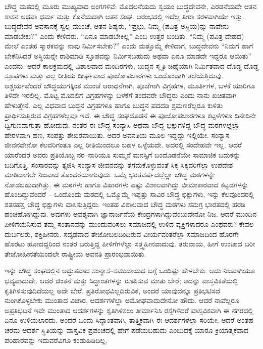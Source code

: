 ಬೌದ್ಧ ಮತದಲ್ಲಿ ಮೂರು ಮುಖ್ಯವಾದ ಅಂಗಗಳಿವೆ: ಮೊದಲನೆಯದು ಸ್ವಯಂ ಬುದ್ಧದೇವನೇ, ಎರಡನೆಯದೇ ಆತನ ಶಾಸನ ಅಥವಾ ಧರ್ಮ ಮತ್ತು ಕೊನೆಯದಾಗಿ ಆತನ ಸಂಘ. ಆರಂಭದಲ್ಲಿ ಇದೆಲ್ಲ ತೀರಾ ಸರಳವಾಗಿಯೇ ಇತ್ತು. ಬುದ್ಧದೇವನ ಅವಸಾನಕ್ಕೆ ಸ್ವಲ್ಪ ಮುಂಚೆ, ಆತನ ಶಿಷ್ಯರು, “ಪ್ರಭು, ನಿಮ್ಮ (ಪವಿತ್ರ ಅಸ್ಥಿಯ)ನ್ನು ನಾವೇನು ಮಾಡಬೇಕು?” ಎಂದು ಕೇಳಿದರು. “ಏನೂ ಮಾಡಬೇಕಿಲ್ಲ” ಎಂಬ ಉತ್ತರ ಬಂದಿತು. “ನಿಮ್ಮ (ಪವಿತ್ರ ದೇಹದ) ಮೇಲೆ ಎಂತಹ ಸ್ಮಾರಕವನ್ನು ನಾವು ನಿರ್ಮಿಸಬೇಕು?” ಎಂದು ಮತ್ತೊಮ್ಮೆ ಕೇಳಿದಾಗ, ಬುದ್ಧದೇವನು “ನಿಮಗೆ ಹಾಗೆ ಬೇಕೆನಿಸಿದರೆ ಅಸ್ಥಿಯನ್ನೇ ರಾಶಿಮಾಡಿ ಸ್ತೂಪವನ್ನು ನಿರ್ಮಿಸಬಹುದು ಅಥವಾ ಏನೂ ಮಾಡದೇ ಇದ್ದರೂ ಆಯಿತು” ಎಂದನು. ಆದರೆ ಕಾಲಕ್ರಮದಲ್ಲಿ ವಿಶಾಲವಾದ ಮಂದಿರಗಳು, ಬುದ್ಧನ ಸ್ಮೃತಿ ಚಿಹ್ನೆಯಾಗಿ ನಿರ್ಮಿತವಾದ ದೊಡ್ಡ ದೊಡ್ಡ ಸ್ತೂಪಗಳು ಮತ್ತು ಎಲ್ಲ ರೀತಿಯ ದೀರ್ಘವಾದ ಪೂಜೋಪಚಾರಗಳು ಒಂದೊಂದಾಗಿ ತಲೆಯೆತ್ತಿದುವು. ಆಶ್ಚರ್ಯವೆಂದರೆ ಬೌದ್ಧಯುಗಕ್ಕಿಂತ ಮುಂಚೆ ಆರಾಧನೆಗಾಗಿ, ಪೂಜೆಗಾಗಿ ವಿಗ್ರಹಗಳ, ಮೂರ್ತಿಗಳ, ಬಳಕೆ ಯಾರಿಗೂ ತಿಳಿದೇ ಇರಲಿಲ್ಲ. ಮೊಟ್ಟ ಮೊದಲಿಗೆ ವಿಗ್ರಹಗಳನ್ನು ಬಳಕೆಗೆ ತಂದವರೇ ಬೌದ್ಧರು ಎಂದು ನಾನು ಖಚಿತವಾಗಿ ಹೇಳುತ್ತೇನೆ. ಎಲ್ಲ ವಿಧವಾದ ಬುದ್ಧನ ವಿಗ್ರಹಗಳೂ ಹಾಗೂ ಬುದ್ಧನ ಪದದಡಿ ಶ್ರಮಣರೆಲ್ಲರೂ ಕುಳಿತು ಪ್ರಾರ್ಥಿಸುತ್ತಿರುವ ವಿಗ್ರಹಗಳೆಲ್ಲವೂ ಇವೆ. ಈ ಬೌದ್ಧ ಸಂಘದೊಡನೆ ಈ ಪೂಜೋಪಚಾರಗಳೂ ಕಟ್ಟಳೆಗಳೂ ದಿನೇದಿನೇ ದ್ವಿಗುಣವಾಗುತ್ತಾ ಹೋದುವು. ನಂತರ ಈ ಬೌದ್ಧ ಸಂನ್ಯಾಸಿ ಅಥವಾ ಬೌದ್ಧ ಭಿಕ್ಷುಗಳಿದ್ದ ಬೌದ್ಧ ಮಠಗಳಲ್ಲೆಲ್ಲಾ ಹೇರಳವಾಗಿ ಹಣ, ಸಂಪತ್ತು ಶೇಖರವಾಯಿತು. ಅದರ ಅವನತಿಯ ಮೂಲ ಇದ್ದದ್ದು ಇಲ್ಲಿಯೇ. ಸಂನ್ಯಾಸ ಜೀವನವೇನೋ ಕೆಲವರಿಗಂತೂ ಎಲ್ಲ ರೀತಿಯಿಂದಲೂ ಬಹಳ ಒಳ್ಳೆಯದೇ. ಅದರಲ್ಲಿ ಸಂದೇಹವೇ ಇಲ್ಲ. ಆದರೆ ಯಾರೆಂದರೆ ಅವರು ಪ್ರತಿಯೊಬ್ಬ ನರ–ನಾರಿಯೂ ಸುಮ್ಮನೆ ಮನಸ್ಸಿಗೆ ಬಂದೊಡನೆಯೇ ಸಾಮಾಜಿಕ ಬದುಕನ್ನು ಬದಿಗೊತ್ತಿ, ಸಂಸಾರವನ್ನು ತ್ಯಜಿಸಿ ಸಂನ್ಯಾಸ ಜೀವನವನ್ನು ತೆಗೆದುಕೊಳ್ಳುವಂತೆ ಸಿಕ್ಕ ಸಿಕ್ಕವರಿಗೆಲ್ಲಾ ಉಪದೇಶ ಮಾಡಿದಾಗಲೇ ನಿಜವಾದ ತೊಂದರೆಯಾಗುವುದು. ಒಮ್ಮೆ ಭರತವರ್ಷದಲ್ಲೆಲ್ಲಾ ಬೌದ್ಧ ಮಠಗಳನ್ನೇ ನೋಡಬಹುದಾಗಿತ್ತು. ಈ ಮಠಗಳು ಹಾಗೂ ವಿಹಾರಗಳು ಎಷ್ಟು ವಿಶಾಲವಾಗಿದ್ದು ಭೀಮಾಕಾರವಾದ ಕಟ್ಟಡಗಳನ್ನು ಹೊಂದಿದ್ದುವೆಂದರೆ – ಒಂದೊಂದು ಮಠದಲ್ಲಿ ಒಮ್ಮೊಮ್ಮೆ ಇಪ್ಪತ್ತು ಸಾವಿರ ಬೌದ್ಧ ಭಿಕ್ಷುಗಳು, ಇನ್ನು ಕೆಲವೊಂದರಲ್ಲಿ ಶತಸಹಸ್ರ ಬೌದ್ಧ ಭಿಕ್ಷುಗಳು ವಾಸಿಸುತ್ತಿದ್ದರು. ಇಂತಹ ವಿಶಾಲವಾದ ಬೌದ್ಧ ಮಠಗಳು ಸಮಗ್ರ ಭಾರತದಲ್ಲಿ ಹರಡಿ ಹಂಚಿಹೋಗಿದ್ದುವು. ಅವುಗಳು ಅವಶ್ಯವಾಗಿ ಜ್ಞಾನಾರ್ಜನೆಯ ಕೇಂದ್ರಗಳಾಗಿದ್ದುವೆಂಬುದೇನೋ ನಿಜ. ಆದರೆ ಮುಂದಿನ ಪೀಳಿಗೆಯೆನಿಸುವ ತಮ್ಮ ಸಂತಾನವನ್ನು ಮುಂದುವರಿಸಲು ಸಮಾಜದಲ್ಲಿ ಉಳಿದ ವ್ಯಕ್ತಿಗಳಾದರೂ ಎಂಥವರು? ಕೇವಲ ದುರ್ಬಲರು, ಶಕ್ತಿಹೀನರು. ಸದೃಢವಾದ ತೇಜೋಬಲದಿಂದಿರುವ ವೀರ್ಯವಂತರೆಲ್ಲಾ ಸಮಾಜದಿಂದ ಹೊರಗೇ ಹೊರಟು ಹೋದದ್ದರಿಂದ ನಂತರ ಬರುತ್ತಿದ್ದ ಪೀಳಿಗೆಗಳೆಲ್ಲಾ ಸತ್ತ್ವಹೀನವಾದುವು. ತರುವಾಯ, ಹೀಗೆ ಉಂಟಾದ ಬರೀ ತೇಜೋಹೀನತೆಯಿಂದಲೇ ರಾಷ್ಟ್ರೀಯ ಅವನತಿ ಪ್ರಾರಂಭವಾಯಿತು.

ಇನ್ನು ಬೌದ್ಧ ಸಂಘದಲ್ಲಿನ ಅದ್ಭುತವಾದ ಸಂನ್ಯಾಸ–ಸಮುದಾಯದ ಬಗ್ಗೆ ಒಂದಿಷ್ಟು ಹೇಳಬೇಕು. ಅದು ನಿಜವಾಗಿಯೂ ಭವ್ಯವಾದುದೇ. ಆದರೆ ಚಿಂತನೆ ಮತ್ತು ಸಿದ್ಧಾಂತಗಳನ್ನು ರೂಪಿಸುವ ಮಾತು ಬೇರೆ; ಅದನ್ನು ವಾಸ್ತವಿಕತೆಯಲ್ಲಿ ಕೃತಿಗಿಳಿಸುವುದಿದೆಯಲ್ಲ ಅದೇ ಬೇರೆ. ಪ್ರತಿರೋಧವಿಲ್ಲದಿರುವಿಕೆ, ಅಂದರೆ ಯಾವುದನ್ನೂ ಪ್ರತಿಭಟಿಸದೆ ನುಂಗಿಕೊಳ್ಳಬೇಕು ಮುಂತಾದ ವಿಚಾರ, ಆದರ್ಶಗಳೆಲ್ಲಾ ಅಮೋಘವಾದುದೇನೋ ಹೌದು. ಆದರೆ ನಾವೆಲ್ಲರೂ ಅಪ್ರತಿಭಟನೆ ಇವೇ ಮುಂತಾದ ಆದರ್ಶಗಳನ್ನು ಕೃತಿಗಿಳಿಸಲು ತೀರ್ಮಾನಿಸಿ ರಸ್ತೆಗಿಳಿದರೆ ವಾಸ್ತವಿಕವಾಗಿ ಈ ನಗರದಲ್ಲಿ ಏನೂ ಉಳಿಯಲಾರದು. ಅಂದರೆ ಒಂದು ಸಿದ್ಧಾಂತವಾಗಿ, ತಾತ್ತ್ವಿಕವಾಗಿ ಈ ಆದರ್ಶಗಳೆಲ್ಲಾ ಸರಿಯೇ; ಆದರೆ ಅಂತಹ ಚರಮ ಆದರ್ಶ ಸ್ಥಿತಿಯನ್ನು ವಾಸ್ತವಿಕ ಪ್ರಪಂಚದಲ್ಲಿ ಹೇಗೆ ಪಡೆಯಬಹುದು ಎಂಬುದಕ್ಕೆ ಯಾರೂ ಕ್ರಿಯಾತ್ಮಕವಾದ ಪರಿಹಾರವನ್ನು ಇದುವರೆವಿಗೂ ಕಂಡುಹಿಡಿದಿಲ್ಲ.


